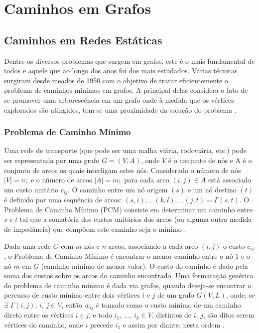 \chapter{Caminhos em Grafos}

\section{Caminhos em Redes Estáticas}
Dentre os diversos problemas que surgem em grafos, este é o mais fundamental de todos e
aquele que ao longo dos anos foi dos mais estudados. Várias técnicas surgiram desde meados
de 1950 com o objetivo de tratar eficientemente o problema de caminhos mínimos em grafos. A
principal delas considera o fato de se promover uma arborescência em um grafo onde à medida
que os vértices explorados são atingidos, tem-se uma proximidade da solução do problema \cite{negreirosbook}.

\subsection{Problema de Caminho Mínimo}
Uma rede de transporte (que pode ser uma malha viária, rodoviária, etc.) pode ser
representada por uma grafo $G = (V, A)$, onde $V$ é o conjunto de nós e A é o conjunto de arcos
os quais interligam estes nós. Considerado o número de nós $|V| = n;$ e o número de arcos $|A| = m;$ para
cada arco $(i, j) \in A$ está associado um custo unitário $c_{ij}$. O caminho entre um
nó origem $(s)$ e um nó destino $(t)$ é definido por uma sequência de
arcos: $(s,i),...(k,l),...(j,t) = \Gamma(s,t)$. O Problema de Caminho Mínimo (PCM) consiste em determinar
um caminho entre $s$ e $t$ tal que a somatória dos custos unitários dos arcos (ou alguma
outra medida de impedância) que compõem este caminho seja o mínimo \cite{cunha}.

Dada uma rede $G$ com $m$ nós e $n$ arcos, associando a cada arco $(i,j)$ o custo $c_{ij}$, o Problema
de Caminho Mínimo é encontrar o menor caminho entre o nó 1 e o nó $m$ em $G$ (caminho mínimo de menor valor).
O custo do caminho é dado pela soma dos custos sobre os arcos do caminho encontrado. Uma formatação genérica do problema
de caminho mínimo é dada via grafos, quando deseja-se encontrar o percurso de custo mínimo entre dois vértices $i$ e $j$
de um grafo $G(V,L)$, onde, se $\exists$ $\Gamma (i,j)$, $i$, $j \in V$, então $w_{ij}$ é tomado como o custo mínimo
de um caminho direto entre os vértices $i$ e $j$, e todo $i_1$, ..., $i_k \in V$, distintos de $i$, $j$, são ditos
serem vértices do caminho, onde $i$ precede $i_1$ e assim por diante, nesta ordem \cite{negreirosbook}.


